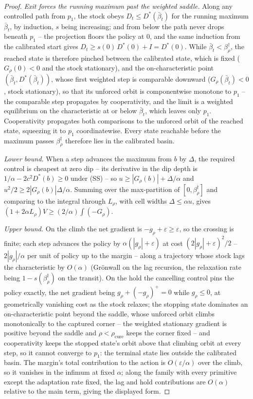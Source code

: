 \documentclass[11pt]{article}
\theoremstyle{definition}
\theoremstyle{remark}
\numberwithin{equation}{section}
\begin{document}
\begin{proof}
\emph{Exit forces the running maximum past the weighted saddle.} Along any controlled path from $p_1$, the stock obeys $D_t \le D^\ast(\bar\beta_t)$ for the running maximum $\bar\beta_t$, by induction, $s$ being increasing; and from below the path never drops beneath $p_1$ -- the projection floors the policy at $0$, and the same induction from the calibrated start gives $D_t \ge s(0)\,D^\ast(0) + I = D^\ast(0)$. While $\bar\beta_t < \beta^\dagger_\rho$, the reached state is therefore pinched between the calibrated state, which is fixed ($G_\rho(0) < 0$ and the stock stationary), and the on-characteristic point $(\bar\beta_t, D^\ast(\bar\beta_t))$, whose first weighted step is comparable downward ($G_\rho(\bar\beta_t) < 0$, stock stationary), so that its unforced orbit is componentwise monotone to $p_1$ -- the comparable step propagates by cooperativity, and the limit is a weighted equilibrium on the characteristic at or below $\bar\beta_t$, which leaves only $p_1$. Cooperativity propagates both comparisons to the unforced orbit of the reached state, squeezing it to $p_1$ coordinatewise. Every state reachable before the maximum passes $\beta^\dagger_\rho$ therefore lies in the calibrated basin.

\emph{Lower bound.} When a step advances the maximum from $b$ by $\Delta$, the required control is cheapest at zero dip -- its derivative in the dip depth is $1/\alpha - 2c^2D^\ast(b) \ge 0$ under (SS) -- so $u \ge |G_\rho(b)| + \Delta/\alpha$ and $u^2/2 \ge 2|G_\rho(b)|\Delta/\alpha$. Summing over the max-partition of $[0, \beta^\dagger_\rho]$ and comparing to the integral through $L_\rho$, with cell widths $\Delta \le \alpha u$, gives $(1+2\alpha L_\rho)V \ge (2/\alpha)\int(-G_\rho)$.

\emph{Upper bound.} On the climb the net gradient is $-g_\rho + \varepsilon \ge \varepsilon$, so the crossing is finite; each step advances the policy by $\alpha(|g_\rho| + \varepsilon)$ at cost $(2|g_\rho| + \varepsilon)^2/2$ -- $2|g_\rho|/\alpha$ per unit of policy up to the margin -- along a trajectory whose stock lags the characteristic by $O(\alpha)$ (Gr\"onwall on the lag recursion, the relaxation rate being $1-s(\beta^\dagger_\rho)$ on the transit). On the hold the cancelling control pins the policy exactly, the net gradient being $g_\rho + (-g_\rho)^+ = 0$ while $g_\rho \le 0$, at geometrically vanishing cost as the stock relaxes; the stopping state dominates an on-characteristic point beyond the saddle, whose unforced orbit climbs monotonically to the captured corner -- the weighted stationary gradient is positive beyond the saddle and $\rho < \rho_{\mathrm{cure}}$ keeps the corner fixed -- and cooperativity keeps the stopped state's orbit above that climbing orbit at every step, so it cannot converge to $p_1$: the terminal state lies outside the calibrated basin. The margin's total contribution to the action is $O(\varepsilon/\alpha)$ over the climb, so it vanishes in the infimum at fixed $\alpha$; along the family with every primitive except the adaptation rate fixed, the lag and hold contributions are $O(\alpha)$ relative to the main term, giving the displayed form.


\end{proof}
\end{document}
